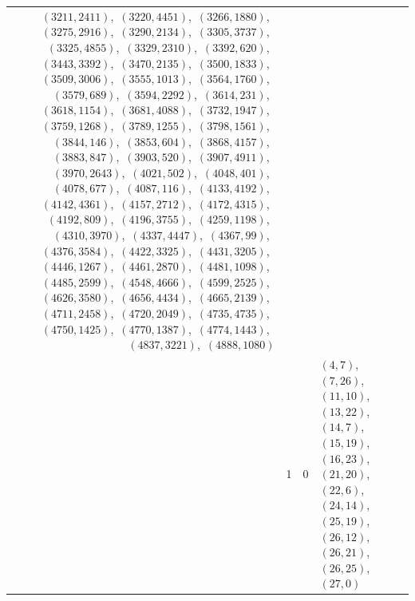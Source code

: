 \documentclass[11pt]{article}
\begin{document}
\begin{longtable}{@{}rrl>{\raggedright\arraybackslash}p{}@{}}
$(3211,2411)$,\allowbreak\ $(3220,4451)$,\allowbreak\ $(3266,1880)$,\allowbreak\ $(3275,2916)$,\allowbreak\ $(3290,2134)$,\allowbreak\ $(3305,3737)$,\allowbreak\ $(3325,4855)$,\allowbreak\ $(3329,2310)$,\allowbreak\ $(3392,620)$,\allowbreak\ $(3443,3392)$,\allowbreak\ $(3470,2135)$,\allowbreak\ $(3500,1833)$,\allowbreak\ $(3509,3006)$,\allowbreak\ $(3555,1013)$,\allowbreak\ $(3564,1760)$,\allowbreak\ $(3579,689)$,\allowbreak\ $(3594,2292)$,\allowbreak\ $(3614,231)$,\allowbreak\ $(3618,1154)$,\allowbreak\ $(3681,4088)$,\allowbreak\ $(3732,1947)$,\allowbreak\ $(3759,1268)$,\allowbreak\ $(3789,1255)$,\allowbreak\ $(3798,1561)$,\allowbreak\ $(3844,146)$,\allowbreak\ $(3853,604)$,\allowbreak\ $(3868,4157)$,\allowbreak\ $(3883,847)$,\allowbreak\ $(3903,520)$,\allowbreak\ $(3907,4911)$,\allowbreak\ $(3970,2643)$,\allowbreak\ $(4021,502)$,\allowbreak\ $(4048,401)$,\allowbreak\ $(4078,677)$,\allowbreak\ $(4087,116)$,\allowbreak\ $(4133,4192)$,\allowbreak\ $(4142,4361)$,\allowbreak\ $(4157,2712)$,\allowbreak\ $(4172,4315)$,\allowbreak\ $(4192,809)$,\allowbreak\ $(4196,3755)$,\allowbreak\ $(4259,1198)$,\allowbreak\ $(4310,3970)$,\allowbreak\ $(4337,4447)$,\allowbreak\ $(4367,99)$,\allowbreak\ $(4376,3584)$,\allowbreak\ $(4422,3325)$,\allowbreak\ $(4431,3205)$,\allowbreak\ $(4446,1267)$,\allowbreak\ $(4461,2870)$,\allowbreak\ $(4481,1098)$,\allowbreak\ $(4485,2599)$,\allowbreak\ $(4548,4666)$,\allowbreak\ $(4599,2525)$,\allowbreak\ $(4626,3580)$,\allowbreak\ $(4656,4434)$,\allowbreak\ $(4665,2139)$,\allowbreak\ $(4711,2458)$,\allowbreak\ $(4720,2049)$,\allowbreak\ $(4735,4735)$,\allowbreak\ $(4750,1425)$,\allowbreak\ $(4770,1387)$,\allowbreak\ $(4774,1443)$,\allowbreak\ $(4837,3221)$,\allowbreak\ $(4888,1080)$\\
\addlinespace[3pt]
29 & 1 & $0$ & $(4,7)$,\allowbreak\ $(7,26)$,\allowbreak\ $(11,10)$,\allowbreak\ $(13,22)$,\allowbreak\ $(14,7)$,\allowbreak\ $(15,19)$,\allowbreak\ $(16,23)$,\allowbreak\ $(21,20)$,\allowbreak\ $(22,6)$,\allowbreak\ $(24,14)$,\allowbreak\ $(25,19)$,\allowbreak\ $(26,12)$,\allowbreak\ $(26,21)$,\allowbreak\ $(26,25)$,\allowbreak\ $(27,0)$\\

\end{longtable}
\end{document}
